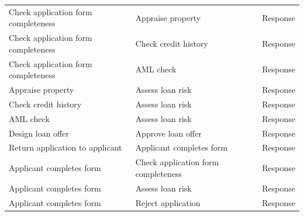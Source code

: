 \begin{longtable}{p{5.5cm} p{5.5cm} p{2cm}}
\addlinespace
\multicolumn{3}{l}{\textit{Responses (11)}} \\
\midrule
Check application form completeness & Appraise property & Response \\
Check application form completeness & Check credit history & Response \\
Check application form completeness & AML check & Response \\
Appraise property & Assess loan risk & Response \\
Check credit history & Assess loan risk & Response \\
AML check & Assess loan risk & Response \\
Design loan offer & Approve loan offer & Response \\
Return application to applicant & Applicant completes form & Response \\
Applicant completes form & Check application form completeness & Response \\
Applicant completes form & Assess loan risk & Response \\
Applicant completes form & Reject application & Response \\


\end{longtable}
